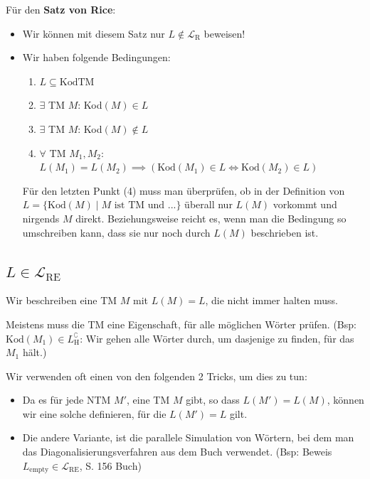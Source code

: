\documentclass[a4paper, 11pt]{article}
\def\L{\mathcal{L}}
\begin{document}
                Für den \textbf{Satz von Rice}:
                \begin{itemize}[label=-]
                    \item Wir können mit diesem Satz nur $L \notin \L_{\text{R}}$ beweisen!
                    \item Wir haben folgende Bedingungen:
                    \begin{enumerate}[label=\roman*.]
                        \item $L \subseteq \text{KodTM}$
                        \item $\exists$ TM $M$: Kod$(M) \in L$
                        \item $\exists$ TM $M$: Kod$(M) \notin L$
                        \item $\forall$ TM $M_1, M_2$: $L(M_1) = L(M_2) \implies \left(\text{Kod}(M_1) \in L \iff \text{Kod}(M_2) \in L\right)$
                    \end{enumerate}
                    Für den letzten Punkt (4) muss man überprüfen, ob in der Definition von $L = \{\text{Kod}(M) \mid M \text{ ist TM und ...}\}$ überall nur $L(M)$ vorkommt und nirgends $M$ direkt. Beziehungsweise reicht es, wenn man die Bedingung so umschreiben kann, dass sie nur noch durch $L(M)$ beschrieben ist.
                \end{itemize}
            
            
            
                \subsection{$L \in \L_{\text{RE}}$}

                    Wir beschreiben eine TM $M$ mit $L(M) = L$, die nicht immer halten muss. 
                    
                    Meistens muss die TM eine Eigenschaft, für alle möglichen Wörter prüfen. (Bsp: $\text{Kod}(M_1) \in L_\text{H}^\complement$: Wir gehen alle Wörter durch, um dasjenige zu finden, für das $M_1$ hält.)
                    
                    Wir verwenden oft einen von den folgenden 2 Tricks, um dies zu tun:
                    \begin{itemize}
                        \item Da es für jede NTM $M'$, eine TM $M$ gibt, so dass $L(M') = L(M)$, können wir eine solche definieren, für die $L(M') = L$ gilt.
                        \item Die andere Variante, ist die parallele Simulation von Wörtern, bei dem man das Diagonalisierungsverfahren aus dem Buch verwendet. (Bsp: Beweis $L_{\text{empty}} \in \L_{\text{RE}}$, S. 156 Buch)
                    \end{itemize}
            
\end{document}
